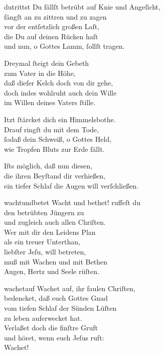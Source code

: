 \documentclass[abbrwidth=6em,tocstyle=ref-genre,shorttitlesize=50]{ees}
\begin{document}
{\begin{movement}{dutrittst}
  \voice[Soprano]
  Du fällſt betrübt auf Knie und Angeſicht,\\
  fängſt an zu zittren und zu zagen\\
  vor der entſetzlich großen Laſt,\\
  die Du auf deinen Rücken haſt\\
  und nun, o Gottes Lamm, ſollſt tragen.

  \voice[Alto]
  Dreymal ſteigt dein Gebeth\\
  zum Vater in die Höhe,\\
  daß dieſer Kelch doch von dir gehe,\\
  doch indes wohlruht auch dein Wille\\
  im Willen deines Vaters ſtille.

  \voice[Soprano]
  Itzt ſtärcket dich ein Himmelsbothe.\\
  Drauf ringſt du mit dem Tode,\\
  ſodaß dein Schweiß, o Gottes Held,\\
  wie Tropfen Bluts zur Erde fällt.

\voice[both]
  Iſts möglich, daß nun diesen,\\
  die ihren Beyſtand dir verhießen,\\
  ein tiefer Schlaf die Augen will verſchließen.
\end{movement}

\begin{movement}{wachtundbetet}
  Wacht und bethet! ruffeſt du\\
  den betrübten Jüngern zu\\
  und zugleich auch allen Chriſten.\\
  Wer mit dir den Leidens Plan\\
  als ein treuer Unterthan,\\
  liebſter Jeſu, will betreten,\\
  muß mit Wachen und mit Bethen\\
  Augen, Hertz und Seele rüſten.
\end{movement}

\begin{movement}{wachetauf}
  \voice[Chor]
  Wachet auf, ihr faulen Chriſten,\\
  bedencket, daß euch Gottes Gnad\\
  vom tiefen Schlaf der Sünden Lüſten\\
  zu leben auferwecket hat.\\
  Verlaßet doch die finſtre Gruft\\
  und höret, wenn euch Jeſus ruft:\\
  Wachet!
\end{movement}

}
\end{document}
